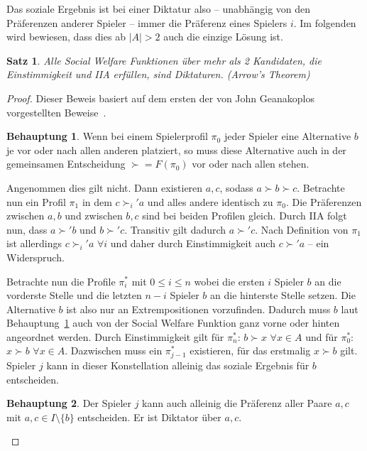 \documentclass[a4paper,11pt]{article}
\theoremstyle{definition}
\theoremstyle{plain}
\newtheorem{theorem}[definition]{Satz}
\theoremstyle{definition}
\newtheorem{claim}{Behauptung}
\begin{document}
Das soziale Ergebnis ist bei einer Diktatur also -- unabhängig von den Präferenzen anderer Spieler -- immer die Präferenz eines Spielers $i$.
Im folgenden wird bewiesen, dass dies ab $|A| > 2$ auch die einzige Lösung ist.

\begin{theorem}
	Alle Social Welfare Funktionen über mehr als 2 Kandidaten, die Einstimmigkeit und IIA erfüllen, sind Diktaturen. (Arrow's Theorem)
\end{theorem}

\begin{proof}
	Dieser Beweis basiert auf dem ersten der von John Geanakoplos vorgestellten Beweise~\cite{gea05}.
	
	\begin{claim} 
		\label{claim:extrementsch}
		Wenn bei einem Spielerprofil $\pi_0$ jeder Spieler eine Alternative $b$ je vor oder nach allen anderen platziert, so muss diese Alternative auch in der gemeinsamen Entscheidung $\succ = F(\pi_0)$ vor oder nach allen stehen.
	\end{claim}

	Angenommen dies gilt nicht. Dann existieren $a, c$, sodass $a \succ b \succ c$. Betrachte nun ein Profil $\pi_1$ in dem $c \succ_i' a$ und alles andere identisch zu $\pi_0$. Die Präferenzen zwischen $a, b$ und zwischen $b, c$ sind bei beiden Profilen gleich. Durch IIA folgt nun, dass $a \succ' b$ und $b \succ' c$. Transitiv gilt dadurch $a \succ' c$. Nach Definition von $\pi_1$ ist allerdings $c \succ_i' a$ $\forall i$ und daher durch Einstimmigkeit auch $c \succ' a$ -- ein Widerspruch.
	
	Betrachte nun die Profile $\pi_i^*$ mit $0 \leq i \leq n$ wobei die ersten $i$ Spieler $b$ an die vorderste Stelle und die letzten $n-i$ Spieler $b$ an die hinterste Stelle setzen. Die Alternative $b$ ist also nur an Extrempositionen vorzufinden. Dadurch muss $b$ laut Behauptung~\ref{claim:extrementsch} auch von der Social Welfare Funktion ganz vorne oder hinten angeordnet werden. Durch Einstimmigkeit gilt für $\pi_n^*$: $b \succ x$ $\forall x \in A$ und für $\pi_0^*$:  $x \succ b$ $\forall x \in A$. Dazwischen muss ein $\pi_{j-1}^*$ existieren, für das erstmalig $x \succ b$ gilt. Spieler $j$ kann in dieser Konstellation alleinig das soziale Ergebnis für $b$ entscheiden.
	
	\begin{claim}
		\label{claim:jdiktac}
		Der Spieler $j$ kann auch alleinig die Präferenz aller Paare $a,c$ mit $a, c \in I \setminus \{b\}$ entscheiden. Er ist Diktator über $a,c$.
	\end{claim}


\end{proof}
\end{document}

